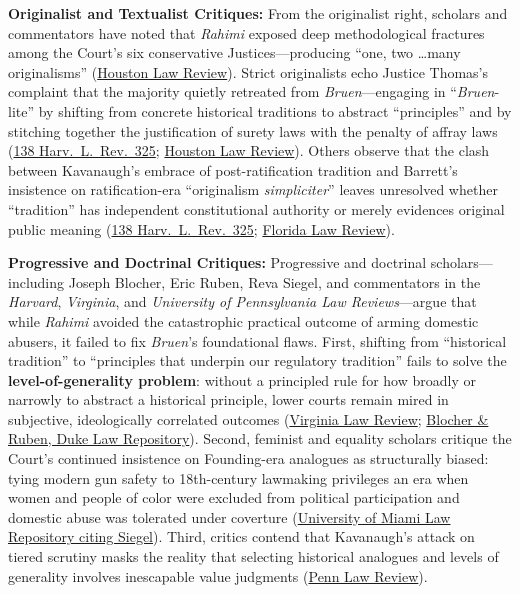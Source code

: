 \documentclass[12pt]{article}
\begin{document}
\textbf{Originalist and Textualist Critiques:} From the originalist right, scholars and commentators have noted that \textit{Rahimi} exposed deep methodological fractures among the Court's six conservative Justices---producing ``one, two \dots many originalisms'' (\href{https://houstonlawreview.org/article/147417-_united-states-v-rahimi_-five-takes}{Houston Law Review}). Strict originalists echo Justice Thomas's complaint that the majority quietly retreated from \textit{Bruen}---engaging in ``\textit{Bruen}-lite'' by shifting from concrete historical traditions to abstract ``principles'' and by stitching together the justification of surety laws with the penalty of affray laws (\href{https://harvardlawreview.org/print/vol-138/united-states-v-rahimi/}{138 Harv.\ L.\ Rev.\ 325}; \href{https://houstonlawreview.org/article/147417-_united-states-v-rahimi_-five-takes}{Houston Law Review}). Others observe that the clash between Kavanaugh's embrace of post-ratification tradition and Barrett's insistence on ratification-era ``originalism \textit{simpliciter}'' leaves unresolved whether ``tradition'' has independent constitutional authority or merely evidences original public meaning (\href{https://harvardlawreview.org/print/vol-138/united-states-v-rahimi/}{138 Harv.\ L.\ Rev.\ 325}; \href{https://www.floridalawreview.com/article/162313-tradition-and-discretion/attachment/345085.pdf}{Florida Law Review}).

\textbf{Progressive and Doctrinal Critiques:} Progressive and doctrinal scholars---including Joseph Blocher, Eric Ruben, Reva Siegel, and commentators in the \textit{Harvard}, \textit{Virginia}, and \textit{University of Pennsylvania Law Reviews}---argue that while \textit{Rahimi} avoided the catastrophic practical outcome of arming domestic abusers, it failed to fix \textit{Bruen}'s foundational flaws. First, shifting from ``historical tradition'' to ``principles that underpin our regulatory tradition'' fails to solve the \textbf{level-of-generality problem}: without a principled rule for how broadly or narrowly to abstract a historical principle, lower courts remain mired in subjective, ideologically correlated outcomes (\href{https://virginialawreview.org/articles/united-states-v-rahimi-we-do-not-resolve-any-of-those-questions-because-we-cannot/}{Virginia Law Review}; \href{https://scholarship.law.duke.edu/cgi/viewcontent.cgi?article=6973&context=faculty_scholarship}{Blocher \& Ruben, Duke Law Repository}). Second, feminist and equality scholars critique the Court's continued insistence on Founding-era analogues as structurally biased: tying modern gun safety to 18th-century lawmaking privileges an era when women and people of color were excluded from political participation and domestic abuse was tolerated under coverture (\href{https://repository.law.miami.edu/cgi/viewcontent.cgi?article=2286&context=fac_articles}{University of Miami Law Repository citing Siegel}). Third, critics contend that Kavanaugh's attack on tiered scrutiny masks the reality that selecting historical analogues and levels of generality involves inescapable value judgments (\href{https://pennlawreview.com/2025/06/10/kavanaugh-rahimi-and-the-effort-to-legitimate-originalism/}{Penn Law Review}).
\end{document}
